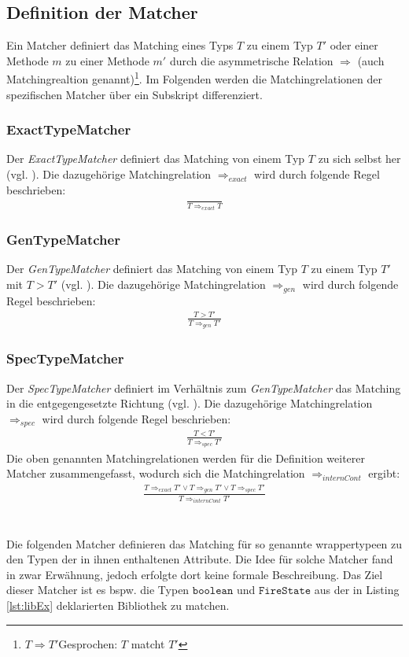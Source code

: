 \subsection{Definition der Matcher}\label{sec_matcher}
Ein Matcher definiert das Matching eines Typs $T$ zu einem Typ $T'$ oder einer Methode $m$ zu einer Methode $m'$ durch die asymmetrische Relation $\Rightarrow$ (auch Matchingrealtion genannt)\footnote{$T \Rightarrow T'$\newline Gesprochen: $T$ matcht $T'$}. Im Folgenden werden die Matchingrelationen der spezifischen Matcher über ein Subskript differenziert.
\subsubsection{ExactTypeMatcher}\label{sec:exacttypematcher}
Der \emph{ExactTypeMatcher} definiert das Matching von einem Typ $T$ zu sich selbst her (vgl. \cite{moormann}). Die dazugehörige Matchingrelation $\Rightarrow_{exact}$ wird durch folgende Regel beschrieben:
\begin{gather*}
\frac{}{T \Rightarrow_{exact} T}
\end{gather*}
\subsubsection{GenTypeMatcher}\label{sec:gentypematcher}
Der \emph{GenTypeMatcher} definiert das Matching von einem Typ $T$ zu einem Typ $T'$ mit $T > T'$ (vgl. \cite{moormann}). Die dazugehörige Matchingrelation $\Rightarrow_{gen}$ wird durch folgende Regel beschrieben:
\begin{gather*}
\frac{T > T'}{T \Rightarrow_{gen} T'}
\end{gather*}
\subsubsection{SpecTypeMatcher}
Der \emph{SpecTypeMatcher} definiert im Verhältnis zum \emph{GenTypeMatcher} das Matching in die entgegengesetzte Richtung (vgl. \cite{moormann}). Die dazugehörige Matchingrelation $\Rightarrow_{spec}$ wird durch folgende Regel beschrieben: 
\begin{gather*}
\frac{T < T'}{T \Rightarrow_{spec} T'}
\end{gather*}
\noindent
Die oben genannten Matchingrelationen werden für die Definition weiterer Matcher zusammengefasst, wodurch sich die Matchingrelation $\Rightarrow_{internCont}$ ergibt:
\begin{gather*}
\frac{T \Rightarrow_{exact} T' \vee T \Rightarrow_{gen} T' \vee
T \Rightarrow_{spec} T'  }{T \Rightarrow_{internCont} T'}
\end{gather*}
\noindent
\\\\
Die folgenden Matcher definieren das Matching für so genannte \Gls{wrappertype}en zu den Typen der in ihnen enthaltenen Attribute. Die Idee für solche Matcher fand in \cite{hummel08} zwar Erwähnung, jedoch erfolgte dort keine formale Beschreibung. Das Ziel dieser Matcher ist es bspw. die Typen $\texttt{boolean}$ und $\texttt{FireState}$ aus der in Listing \ref{lst:libEx} deklarierten Bibliothek zu matchen.

